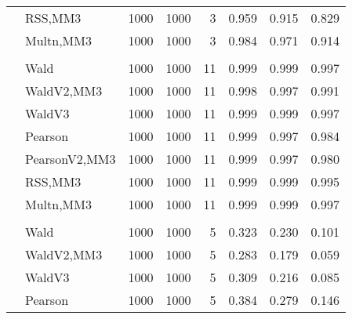 \documentclass[
]{article}
\begin{document}
\begin{table}[H]
{\begin{tabular}[t]{llrrrrrr}
\hspace{1em} & RSS,MM3 & 1000 & 1000 & 3 & 0.959 & 0.915 & 0.829\\

\hspace{1em} & Multn,MM3 & 1000 & 1000 & 3 & 0.984 & 0.971 & 0.914\\
\cmidrule{1-8}
\addlinespace[0.3em]
\multicolumn{8}{l}{\textbf{1F 15V}}\\
\hspace{1em} & Wald & 1000 & 1000 & 11 & 0.999 & 0.999 & 0.997\\

\hspace{1em} & WaldV2,MM3 & 1000 & 1000 & 11 & 0.998 & 0.997 & 0.991\\

\hspace{1em} & WaldV3 & 1000 & 1000 & 11 & 0.999 & 0.999 & 0.997\\

\hspace{1em} & Pearson & 1000 & 1000 & 11 & 0.999 & 0.997 & 0.984\\

\hspace{1em} & PearsonV2,MM3 & 1000 & 1000 & 11 & 0.999 & 0.997 & 0.980\\

\hspace{1em} & RSS,MM3 & 1000 & 1000 & 11 & 0.999 & 0.999 & 0.995\\

\hspace{1em} & Multn,MM3 & 1000 & 1000 & 11 & 0.999 & 0.999 & 0.997\\
\cmidrule{1-8}
\addlinespace[0.3em]
\multicolumn{8}{l}{\textbf{2F 10V}}\\
\hspace{1em} & Wald & 1000 & 1000 & 5 & 0.323 & 0.230 & 0.101\\

\hspace{1em} & WaldV2,MM3 & 1000 & 1000 & 5 & 0.283 & 0.179 & 0.059\\

\hspace{1em} & WaldV3 & 1000 & 1000 & 5 & 0.309 & 0.216 & 0.085\\

\hspace{1em} & Pearson & 1000 & 1000 & 5 & 0.384 & 0.279 & 0.146\\


\end{tabular}}
\end{table}
\end{document}
